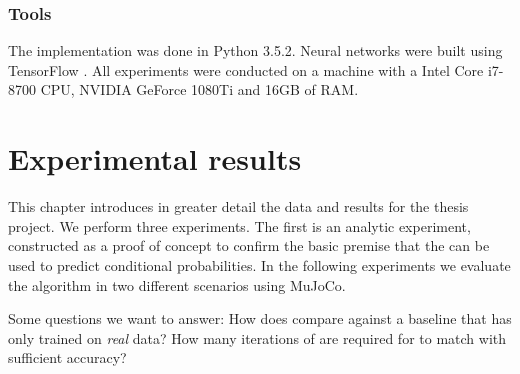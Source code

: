

\subsection{Tools}

The implementation was done in Python 3.5.2. Neural networks were built using TensorFlow \parencite{tensorflow2015-whitepaper}. 
All experiments were conducted on a machine with a Intel Core i7-8700 CPU, NVIDIA GeForce 1080Ti and 16GB of RAM.





\chapter{Experimental results}
\label{experiments}

This chapter introduces in greater detail the data and results for the thesis project. We perform three experiments. The first is an analytic experiment, constructed as a proof of concept to confirm the basic premise that the \cvae{} can be used to predict conditional probabilities. In the following experiments we evaluate the \dettostoc{} algorithm in two different scenarios using MuJoCo.

Some questions we want to answer: How does \dettostoc{} compare against a baseline that has only trained on \emph{real} data? How many iterations of \dettostoc{} are required for \fdecoder{} to match \fsimulator{} with sufficient accuracy?


